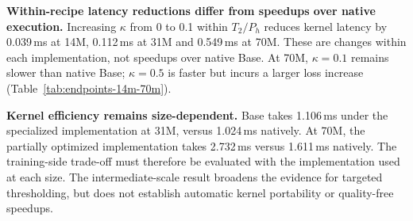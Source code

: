 \textbf{Within-recipe latency reductions differ from speedups over native execution.}
Increasing $\kappa$ from 0 to 0.1 within $T_2/P_h$ reduces kernel latency by 0.039\,ms at 14M, 0.112\,ms at 31M and 0.549\,ms at 70M. These are changes within each implementation, not speedups over native Base. At 70M, $\kappa=0.1$ remains slower than native Base; $\kappa=0.5$ is faster but incurs a larger loss increase (Table~\ref{tab:endpoints-14m-70m}).

\textbf{Kernel efficiency remains size-dependent.}
Base takes 1.106\,ms under the specialized implementation at 31M, versus 1.024\,ms natively. At 70M, the partially optimized implementation takes 2.732\,ms versus 1.611\,ms natively. The training-side trade-off must therefore be evaluated with the implementation used at each size. The intermediate-scale result broadens the evidence for targeted thresholding, but does not establish automatic kernel portability or quality-free speedups.


